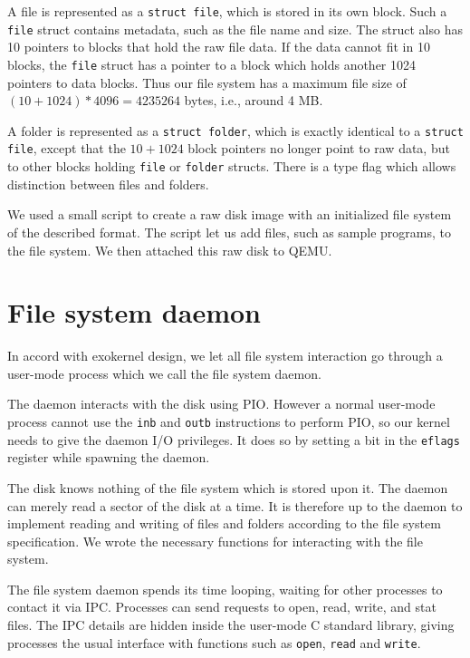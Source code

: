 \documentclass{report}
\begin{document}

A file is represented as a \texttt{struct file}, which is stored in its own
block. Such a \texttt{file} struct contains metadata, such as the file name
and size. The struct also has 10 pointers to blocks that hold the raw file
data. If the data cannot fit in 10 blocks, the \texttt{file} struct has a
pointer to a block which holds another 1024 pointers to data blocks. Thus our
file system has a maximum file size of $(10+1024)*4096 = 4235264$ bytes, i.e.,
around 4 MB.


A folder is represented as a \texttt{struct folder}, which is exactly
identical to a \texttt{struct file}, except that the $10+1024$ block pointers
no longer point to raw data, but to other blocks holding \texttt{file} or
\texttt{folder} structs. There is a type flag which allows distinction between
files and folders.

We used a small script to create a raw disk image with an initialized file
system of the described format. The script let us add files, such as sample
programs, to the file system. We then attached this raw disk to QEMU.



\section{File system daemon}
In accord with exokernel design, we let all file system interaction go through
a user-mode process which we call the file system daemon.

The daemon interacts with the disk using PIO. However a normal user-mode
process cannot use the \texttt{inb} and \texttt{outb} instructions to perform
PIO, so our kernel needs to give the daemon I/O privileges. It does so
by setting a bit in the \texttt{eflags} register while spawning the daemon.

The disk knows nothing of the file system which is stored upon it. The daemon
can merely read a sector of the disk at a time. It is therefore up to the
daemon to implement reading and writing of files and folders according to the
file system specification. We wrote the necessary functions for interacting
with the file system.

The file system daemon spends its time looping, waiting for other processes to
contact it via IPC. Processes can send requests to open, read, write,
and stat files. The IPC details are hidden inside the user-mode C standard
library, giving processes the usual interface with functions such as
\texttt{open}, \texttt{read} and \texttt{write}.
\end{document}
